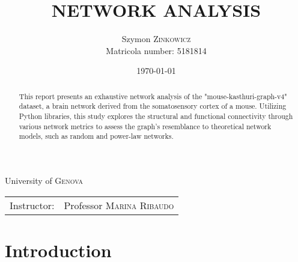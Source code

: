 \documentclass[
	report, %
	11pt, %
]{CSUniSchoolLabReport}
\title{NETWORK ANALYSIS} %
\author{Szymon \textsc{Zinkowicz} \\ Matricola number: 5181814} %
\date{\today} %
\begin{document}
\maketitle %
\thispagestyle{empty}

\begin{center}
	\vspace{\fill}
	University of \textsc{Genova} \\
	\begin{tabular}{l r}
		Instructor: & Professor \textsc{Marina Ribaudo}
	\end{tabular}
\end{center}
\pagebreak



\begin{abstract}
	\thispagestyle{empty}
	This report presents an exhaustive network analysis of the "mouse-kasthuri-graph-v4" dataset, a brain network derived from the somatosensory cortex of a mouse. Utilizing Python libraries, this study explores the structural and functional connectivity through various network metrics to assess the graph's resemblance to theoretical network models, such as random and power-law networks.\\
	
\end{abstract}
\pagebreak

\tableofcontents %
\thispagestyle{empty}
\pagebreak

\section{Introduction}
\end{document}
